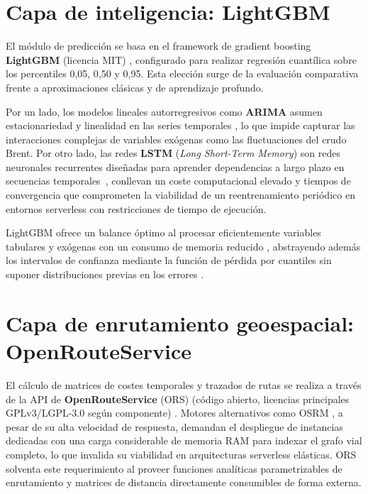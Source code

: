 \section{Capa de inteligencia: LightGBM}
El módulo de predicción se basa en el framework de gradient boosting \textbf{LightGBM} (licencia MIT) \cite{lightgbm},
configurado para realizar regresión cuantílica sobre los percentiles 0{,}05, 0{,}50 y 0{,}95.
Esta elección surge de la evaluación comparativa frente a aproximaciones clásicas y de aprendizaje profundo.

Por un lado, los modelos lineales autorregresivos como \textbf{ARIMA} asumen estacionariedad y
linealidad en las series temporales \cite{hyndman2018forecasting}, lo que impide capturar las interacciones
complejas de variables exógenas como las fluctuaciones del crudo Brent. Por otro lado, las redes \textbf{LSTM} (\textit{Long Short-Term Memory})
son redes neuronales recurrentes diseñadas para aprender dependencias a largo plazo en secuencias
temporales~\cite{8945584}, conllevan un coste computacional elevado y tiempos de convergencia que comprometen la viabilidad de un reentrenamiento
periódico en entornos serverless con restricciones de tiempo de ejecución.

LightGBM ofrece un balance óptimo al procesar
eficientemente variables tabulares y exógenas con un consumo de memoria reducido \cite{hartanto2023lightgbm, LAHMIRI2024105008}, abstrayendo
además los intervalos de confianza mediante la función de pérdida por cuantiles sin suponer distribuciones previas en los errores \cite{s24124013}.


\section{Capa de enrutamiento geoespacial: OpenRouteService}

El cálculo de matrices de costes temporales y trazados de rutas se realiza a través de la API
de \textbf{OpenRouteService} (ORS) (código abierto, licencias principales GPLv3/LGPL-3.0 según componente)
\cite{openrouteservice_api}. Motores alternativos como OSRM \cite{osm_wiki_routers},
a pesar de su alta velocidad de respuesta, demandan el despliegue de instancias dedicadas con una carga considerable
de memoria RAM para indexar el grafo vial completo, lo que invalida su viabilidad en arquitecturas serverless elásticas. ORS
solventa este requerimiento al proveer funciones analíticas parametrizables de enrutamiento y matrices de distancia directamente consumibles de forma externa.

